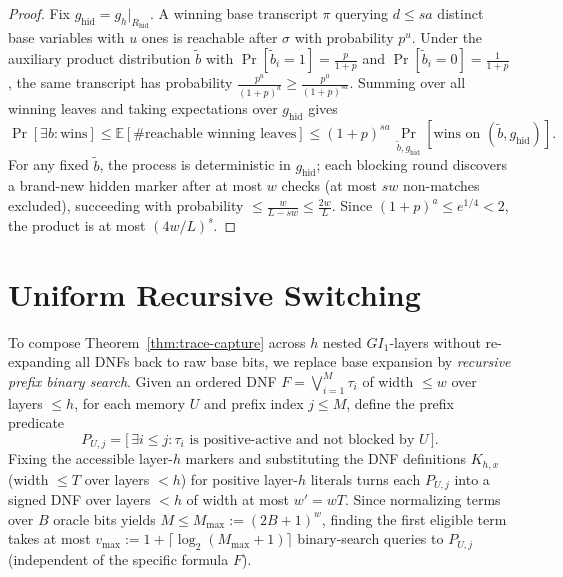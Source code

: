 \documentclass[11pt,a4paper]{article}
\theoremstyle{definition}
\theoremstyle{remark}
\newcommand{\E}{\mathbb{E}}
\newcommand{\Prb}{\Pr}
\newcommand{\GI}{GI_1}
\begin{document}
\begin{proof}
Fix $g_{\mathrm{hid}} = g_h|_{R_{\mathrm{hid}}}$. A winning base transcript $\pi$ querying $d \le sa$ distinct base variables with $u$ ones is reachable after $\sigma$ with probability $p^u$. Under the auxiliary product distribution $\tilde{b}$ with $\Prb[\tilde{b}_i = 1] = \frac{p}{1+p}$ and $\Prb[\tilde{b}_i = 0] = \frac{1}{1+p}$, the same transcript has probability $\frac{p^u}{(1+p)^d} \ge \frac{p^u}{(1+p)^{sa}}$. Summing over all winning leaves and taking expectations over $g_{\mathrm{hid}}$ gives
\[
  \Prb[\exists b : \text{wins}] \le \E[\#\text{reachable winning leaves}]
  \le (1+p)^{sa}\, \Prb_{\tilde{b}, g_{\mathrm{hid}}}[\text{wins on } (\tilde{b}, g_{\mathrm{hid}})].
\]
For any fixed $\tilde{b}$, the process is deterministic in $g_{\mathrm{hid}}$; each blocking round discovers a brand-new hidden marker after at most $w$ checks (at most $sw$ non-matches excluded), succeeding with probability $\le \frac{w}{L - sw} \le \frac{2w}{L}$. Since $(1+p)^a \le e^{1/4} < 2$, the product is at most $(4w/L)^s$.
\end{proof}

\section{Uniform Recursive Switching}

To compose Theorem~\ref{thm:trace-capture} across $h$ nested $\GI$-layers without re-expanding all DNFs back to raw base bits, we replace base expansion by \emph{recursive prefix binary search}. Given an ordered DNF $F = \bigvee_{i=1}^M \tau_i$ of width $\le w$ over layers $\le h$, for each memory $U$ and prefix index $j \le M$, define the prefix predicate
\[
  P_{U,j} = \bigl[\,\exists i \le j : \tau_i \text{ is positive-active and not blocked by } U\,\bigr].
\]
Fixing the accessible layer-$h$ markers and substituting the DNF definitions $K_{h,x}$ (width $\le T$ over layers $< h$) for positive layer-$h$ literals turns each $P_{U,j}$ into a signed DNF over layers $< h$ of width at most $w' = wT$. Since normalizing terms over $B$ oracle bits yields $M \le M_{\max} := (2B+1)^w$, finding the first eligible term takes at most $v_{\max} := 1 + \lceil \log_2(M_{\max}+1) \rceil$ binary-search queries to $P_{U,j}$ (independent of the specific formula $F$).
\end{document}
